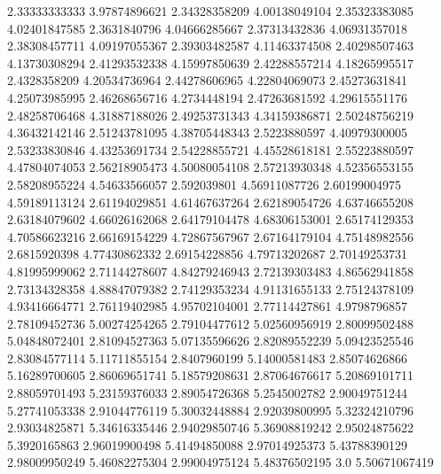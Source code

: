   2.33333333333    3.97874896621
  2.34328358209    4.00138049104
  2.35323383085    4.02401847585
   2.3631840796    4.04666285667
  2.37313432836    4.06931357018
  2.38308457711    4.09197055367
  2.39303482587    4.11463374508
  2.40298507463    4.13730308294
  2.41293532338    4.15997850639
  2.42288557214    4.18265995517
   2.4328358209    4.20534736964
  2.44278606965    4.22804069073
  2.45273631841    4.25073985995
  2.46268656716     4.2734448194
  2.47263681592    4.29615551176
  2.48258706468    4.31887188026
  2.49253731343    4.34159386871
  2.50248756219    4.36432142146
  2.51243781095    4.38705448343
   2.5223880597    4.40979300005
  2.53233830846    4.43253691734
  2.54228855721    4.45528618181
  2.55223880597    4.47804074053
  2.56218905473    4.50080054108
  2.57213930348    4.52356553155
  2.58208955224    4.54633566057
    2.592039801    4.56911087726
  2.60199004975    4.59189113124
  2.61194029851    4.61467637264
  2.62189054726    4.63746655208
  2.63184079602    4.66026162068
  2.64179104478    4.68306153001
  2.65174129353    4.70586623216
  2.66169154229    4.72867567967
  2.67164179104    4.75148982556
   2.6815920398    4.77430862332
  2.69154228856    4.79713202687
  2.70149253731    4.81995999062
  2.71144278607    4.84279246943
  2.72139303483    4.86562941858
  2.73134328358    4.88847079382
  2.74129353234    4.91131655133
  2.75124378109    4.93416664771
  2.76119402985    4.95702104001
  2.77114427861     4.9798796857
  2.78109452736    5.00274254265
  2.79104477612    5.02560956919
  2.80099502488    5.04848072401
  2.81094527363    5.07135596626
  2.82089552239    5.09423525546
  2.83084577114    5.11711855154
   2.8407960199    5.14000581483
  2.85074626866    5.16289700605
  2.86069651741    5.18579208631
  2.87064676617    5.20869101711
  2.88059701493    5.23159376033
  2.89054726368     5.2545002782
  2.90049751244    5.27741053338
  2.91044776119    5.30032448884
  2.92039800995    5.32324210796
  2.93034825871    5.34616335446
  2.94029850746    5.36908819242
  2.95024875622     5.3920165863
  2.96019900498    5.41494850088
  2.97014925373    5.43788390129
  2.98009950249    5.46082275304
  2.99004975124    5.48376502195
            3.0    5.50671067419
